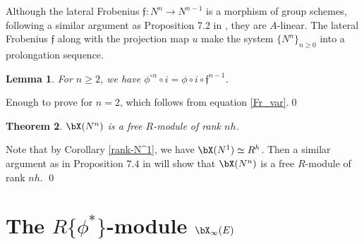 \documentclass{amsart}
\newtheorem {theorem} {\bf{Theorem}}[section]
\newtheorem {lemma}[theorem] {\bf Lemma}
\numberwithin {equation}{section}
\def \hG{\hat{\mathbb{G}}_{\mathrm{a}}}
\begin{document}
Although the lateral Frobenius $\mathfrak{f}:N^{n}\rightarrow N^{n-1}$ is a
morphism of group schemes, following a similar argument as Proposition 7.2 in \cite{BS b}, they are $A$-linear.
The lateral Frobenius $\mathfrak{f}$ along with the projection map $u$  make the system $\{N^{n}\}_{n\geq 0}$ into a prolongation sequence. 

\begin{lemma}\label{lf identity}
For $n\geq 2$, we have $\phi^{\circ n}\circ i=\phi\circ i\circ \mathfrak{f}^{n-1}$.
\end{lemma}
\proof Enough to prove for $n=2$, which follows from equation \eqref{Fr_var}.\qed

%
%


\begin{theorem}\label{basis_canonical_char} ${\bX}(N^{n})$ is a free 
$R$-module of rank $nh$.

\end{theorem}
\proof Note that by Corollary \ref{rank-N^1}, we have $\bX(N^{1})\simeq R^{h}$.   
 Then a similar argument as in Proposition $7.4$ in \cite{BS b} will show that ${\bX}(N^{n})$ is a free $R$-module of rank $nh$.
\qed
\section{The $R\{\phi^*\}$-module ${\bX}_{\infty}(E)$}
%
% 
\end{document}
